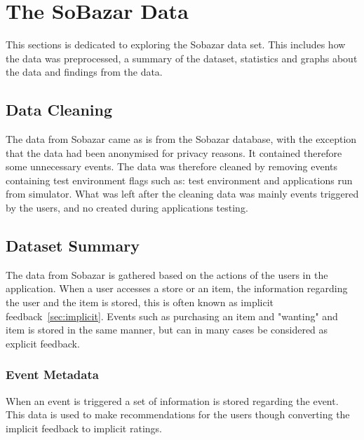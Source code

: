 
\chapter{The SoBazar Data}
\minitoc
    This sections is dedicated to exploring the Sobazar data set.
    This includes how the data was preprocessed, a summary of the dataset, statistics and graphs about the data and findings from the data.



\section{Data Cleaning}
    The data from Sobazar came as is from the Sobazar database, with the exception that the data had been anonymised for privacy reasons.
    It contained therefore some unnecessary events.
    The data was therefore cleaned by removing events containing test environment flags such as: test environment and applications run from simulator.
    What was left after the cleaning data was mainly events triggered by the users, and no created during applications testing.


\section{Dataset Summary}
    The data from Sobazar is gathered based on the actions of the users in the application.
    When a user accesses a store or an item, the information regarding the user and the item is stored, this is often known as implicit feedback~\ref{sec:implicit}.
    Events such as purchasing an item and "wanting" and item is stored in the same manner, but can in many cases be considered as explicit feedback.

\subsection{Event Metadata}
    When an event is triggered a set of information is stored regarding the event.
    This data is used to make recommendations for the users though converting the implicit feedback to implicit ratings.


